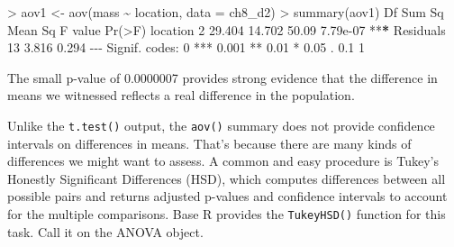 \documentclass[
]{book}
\newenvironment{Shaded}{\begin{snugshade}}{\end{snugshade}}
\newcommand{\AttributeTok}[1]{\textcolor[rgb]{0.77,0.63,0.00}{#1}}
\newcommand{\DecValTok}[1]{\textcolor[rgb]{0.00,0.00,0.81}{#1}}
\newcommand{\ErrorTok}[1]{\textcolor[rgb]{0.64,0.00,0.00}{\textbf{#1}}}
\newcommand{\FloatTok}[1]{\textcolor[rgb]{0.00,0.00,0.81}{#1}}
\newcommand{\FunctionTok}[1]{\textcolor[rgb]{0.00,0.00,0.00}{#1}}
\newcommand{\NormalTok}[1]{#1}
\newcommand{\OtherTok}[1]{\textcolor[rgb]{0.56,0.35,0.01}{#1}}
\newcommand{\SpecialCharTok}[1]{\textcolor[rgb]{0.00,0.00,0.00}{#1}}
\newcommand{\StringTok}[1]{\textcolor[rgb]{0.31,0.60,0.02}{#1}}
\begin{document}
\begin{Shaded}
\begin{Highlighting}[]
\SpecialCharTok{\textgreater{}}\NormalTok{ aov1 }\OtherTok{\textless{}{-}} \FunctionTok{aov}\NormalTok{(mass }\SpecialCharTok{\textasciitilde{}}\NormalTok{ location, }\AttributeTok{data =}\NormalTok{ ch8\_d2)}
\SpecialCharTok{\textgreater{}} \FunctionTok{summary}\NormalTok{(aov1)}
\NormalTok{            Df Sum Sq Mean Sq F value   }\FunctionTok{Pr}\NormalTok{(}\SpecialCharTok{\textgreater{}}\NormalTok{F)    }
\NormalTok{location     }\DecValTok{2} \FloatTok{29.404}  \FloatTok{14.702}   \FloatTok{50.09} \FloatTok{7.79e{-}07} \SpecialCharTok{**}\ErrorTok{*}
\NormalTok{Residuals   }\DecValTok{13}  \FloatTok{3.816}   \FloatTok{0.294}                     
\SpecialCharTok{{-}{-}{-}}
\NormalTok{Signif. codes}\SpecialCharTok{:}  \DecValTok{0} \StringTok{\textquotesingle{}***\textquotesingle{}} \FloatTok{0.001} \StringTok{\textquotesingle{}**\textquotesingle{}} \FloatTok{0.01} \StringTok{\textquotesingle{}*\textquotesingle{}} \FloatTok{0.05} \StringTok{\textquotesingle{}.\textquotesingle{}} \FloatTok{0.1} \StringTok{\textquotesingle{} \textquotesingle{}} \DecValTok{1}
\end{Highlighting}
\end{Shaded}

The small p-value of 0.0000007 provides strong evidence that the difference in means we witnessed reflects a real difference in the population.

Unlike the \texttt{t.test()} output, the \texttt{aov()} summary does not provide confidence intervals on differences in means. That's because there are many kinds of differences we might want to assess. A common and easy procedure is Tukey's Honestly Significant Differences (HSD), which computes differences between all possible pairs and returns adjusted p-values and confidence intervals to account for the multiple comparisons. Base R provides the \texttt{TukeyHSD()} function for this task. Call it on the ANOVA object.

\begin{Shaded}
\end{Shaded}
\end{document}

